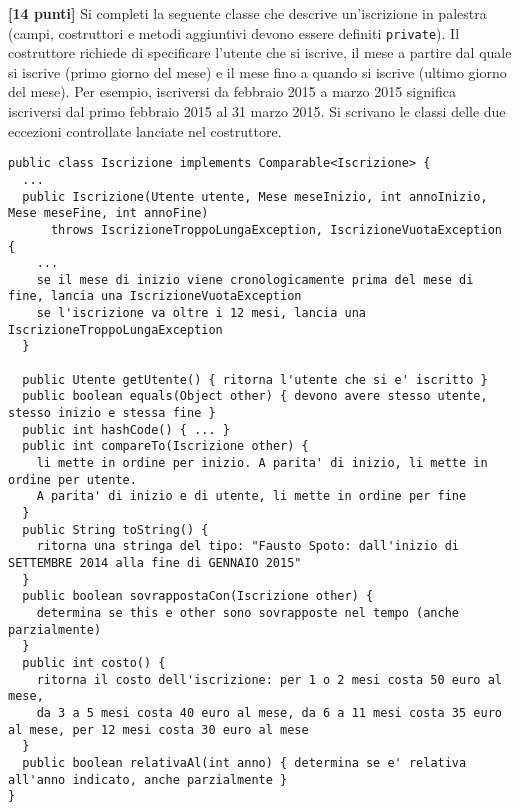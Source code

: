 \documentclass{article}[10pt]
\newcounter{esnu}
\newenvironment{esercizio}{\medskip \noindent {\bf Esercizio\addtocounter{esnu}{1} \arabic{esnu}}}{}
\begin{document}
\begin{esercizio}
\textbf{[14 punti]}
Si completi la seguente classe che descrive un'iscrizione in palestra
(campi, costruttori e metodi aggiuntivi devono essere definiti \texttt{private}).
Il costruttore richiede di specificare l'utente che si iscrive, il mese
a partire dal quale si iscrive (primo giorno del mese) e il mese fino a quando
si iscrive (ultimo giorno del mese). Per esempio, iscriversi da febbraio 2015 a marzo 2015
significa iscriversi dal primo febbraio 2015 al 31 marzo 2015. Si scrivano le classi
delle due eccezioni controllate lanciate nel costruttore.

{\small\begin{verbatim}
public class Iscrizione implements Comparable<Iscrizione> {
  ...
  public Iscrizione(Utente utente, Mese meseInizio, int annoInizio, Mese meseFine, int annoFine)
      throws IscrizioneTroppoLungaException, IscrizioneVuotaException {
    ...
    se il mese di inizio viene cronologicamente prima del mese di fine, lancia una IscrizioneVuotaException
    se l'iscrizione va oltre i 12 mesi, lancia una IscrizioneTroppoLungaException
  }

  public Utente getUtente() { ritorna l'utente che si e' iscritto }
  public boolean equals(Object other) { devono avere stesso utente, stesso inizio e stessa fine }
  public int hashCode() { ... }
  public int compareTo(Iscrizione other) {
    li mette in ordine per inizio. A parita' di inizio, li mette in ordine per utente.
    A parita' di inizio e di utente, li mette in ordine per fine
  }
  public String toString() {
    ritorna una stringa del tipo: "Fausto Spoto: dall'inizio di SETTEMBRE 2014 alla fine di GENNAIO 2015"
  }
  public boolean sovrappostaCon(Iscrizione other) { 
    determina se this e other sono sovrapposte nel tempo (anche parzialmente)
  }
  public int costo() {
    ritorna il costo dell'iscrizione: per 1 o 2 mesi costa 50 euro al mese,
    da 3 a 5 mesi costa 40 euro al mese, da 6 a 11 mesi costa 35 euro al mese, per 12 mesi costa 30 euro al mese
  }
  public boolean relativaAl(int anno) { determina se e' relativa all'anno indicato, anche parzialmente }
}
\end{verbatim}}

\end{esercizio}
\end{document}
